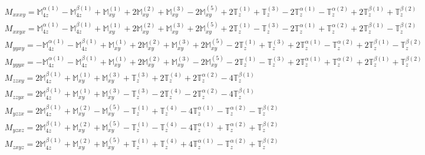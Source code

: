 \documentclass[fleqn,8pt,landscape]{jsarticle}
\begin{document}
\begin{align*}
& M_{xxxy} = \mathbb{M}_{4z}^{\alpha(1)} - \mathbb{M}_{4z}^{\beta(1)} + \mathbb{M}_{xy}^{(1)} + 2 \mathbb{M}_{xy}^{(2)} + \mathbb{M}_{xy}^{(3)} - 2 \mathbb{M}_{xy}^{(5)} + 2 \mathbb{T}_{z}^{(1)} + \mathbb{T}_{z}^{(3)} - 2 \mathbb{T}_{z}^{\alpha(1)} - \mathbb{T}_{z}^{\alpha(2)} + 2 \mathbb{T}_{z}^{\beta(1)} + \mathbb{T}_{z}^{\beta(2)} \\
& M_{xxyx} = \mathbb{M}_{4z}^{\alpha(1)} - \mathbb{M}_{4z}^{\beta(1)} + \mathbb{M}_{xy}^{(1)} + 2 \mathbb{M}_{xy}^{(2)} + \mathbb{M}_{xy}^{(3)} + 2 \mathbb{M}_{xy}^{(5)} + 2 \mathbb{T}_{z}^{(1)} - \mathbb{T}_{z}^{(3)} - 2 \mathbb{T}_{z}^{\alpha(1)} + \mathbb{T}_{z}^{\alpha(2)} + 2 \mathbb{T}_{z}^{\beta(1)} - \mathbb{T}_{z}^{\beta(2)} \\
& M_{yyxy} = - \mathbb{M}_{4z}^{\alpha(1)} - \mathbb{M}_{4z}^{\beta(1)} + \mathbb{M}_{xy}^{(1)} + 2 \mathbb{M}_{xy}^{(2)} + \mathbb{M}_{xy}^{(3)} + 2 \mathbb{M}_{xy}^{(5)} - 2 \mathbb{T}_{z}^{(1)} + \mathbb{T}_{z}^{(3)} + 2 \mathbb{T}_{z}^{\alpha(1)} - \mathbb{T}_{z}^{\alpha(2)} + 2 \mathbb{T}_{z}^{\beta(1)} - \mathbb{T}_{z}^{\beta(2)} \\
& M_{yyyx} = - \mathbb{M}_{4z}^{\alpha(1)} - \mathbb{M}_{4z}^{\beta(1)} + \mathbb{M}_{xy}^{(1)} + 2 \mathbb{M}_{xy}^{(2)} + \mathbb{M}_{xy}^{(3)} - 2 \mathbb{M}_{xy}^{(5)} - 2 \mathbb{T}_{z}^{(1)} - \mathbb{T}_{z}^{(3)} + 2 \mathbb{T}_{z}^{\alpha(1)} + \mathbb{T}_{z}^{\alpha(2)} + 2 \mathbb{T}_{z}^{\beta(1)} + \mathbb{T}_{z}^{\beta(2)} \\
& M_{zzxy} = 2 \mathbb{M}_{4z}^{\beta(1)} + \mathbb{M}_{xy}^{(1)} + \mathbb{M}_{xy}^{(3)} + \mathbb{T}_{z}^{(3)} + 2 \mathbb{T}_{z}^{(4)} + 2 \mathbb{T}_{z}^{\alpha(2)} - 4 \mathbb{T}_{z}^{\beta(1)} \\
& M_{zzyx} = 2 \mathbb{M}_{4z}^{\beta(1)} + \mathbb{M}_{xy}^{(1)} + \mathbb{M}_{xy}^{(3)} - \mathbb{T}_{z}^{(3)} - 2 \mathbb{T}_{z}^{(4)} - 2 \mathbb{T}_{z}^{\alpha(2)} - 4 \mathbb{T}_{z}^{\beta(1)} \\
& M_{yzzx} = 2 \mathbb{M}_{4z}^{\beta(1)} + \mathbb{M}_{xy}^{(2)} - \mathbb{M}_{xy}^{(5)} - \mathbb{T}_{z}^{(1)} + \mathbb{T}_{z}^{(4)} - 4 \mathbb{T}_{z}^{\alpha(1)} - \mathbb{T}_{z}^{\alpha(2)} - \mathbb{T}_{z}^{\beta(2)} \\
& M_{yzxz} = 2 \mathbb{M}_{4z}^{\beta(1)} + \mathbb{M}_{xy}^{(2)} + \mathbb{M}_{xy}^{(5)} - \mathbb{T}_{z}^{(1)} - \mathbb{T}_{z}^{(4)} - 4 \mathbb{T}_{z}^{\alpha(1)} + \mathbb{T}_{z}^{\alpha(2)} + \mathbb{T}_{z}^{\beta(2)} \\
& M_{zxyz} = 2 \mathbb{M}_{4z}^{\beta(1)} + \mathbb{M}_{xy}^{(2)} + \mathbb{M}_{xy}^{(5)} + \mathbb{T}_{z}^{(1)} + \mathbb{T}_{z}^{(4)} + 4 \mathbb{T}_{z}^{\alpha(1)} - \mathbb{T}_{z}^{\alpha(2)} + \mathbb{T}_{z}^{\beta(2)} \\

\end{align*}
\end{document}
